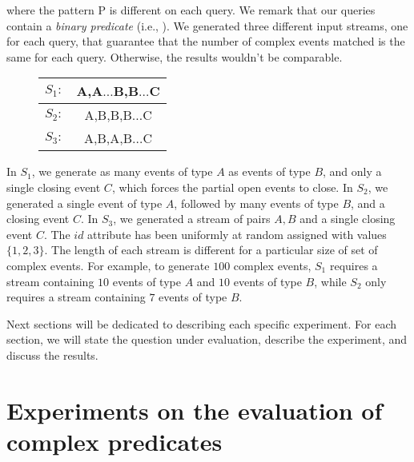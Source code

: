 where the pattern \textrm{P} is different on each query. We remark that our queries contain a \emph{binary predicate} (i.e., ). We generated three different input streams, one for each query, that guarantee that the number of complex events matched is the same for each query. Otherwise, the results wouldn't be comparable.

\begin{figure}[H]
  \centering
  \begin{tabular}{l c}
    \hline
    $S_{1}:$ & A,A$\ldots$B,B$\ldots$C\\
    \hline
    $S_{2}:$ & A,B,B,B$\ldots$C\\
    \hline
    $S_{3}:$ & A,B,A,B$\ldots$C\\
    \hline
  \end{tabular}
\end{figure}

In $S_{1}$, we generate as many events of type $A$ as events of type $B$, and only a single closing event $C$, which forces the partial open events to close. In $S_{2}$, we generated a single event of type $A$, followed by many events of type $B$, and a closing event $C$. In $S_{3}$, we generated a stream of pairs $A, B$ and a single closing event $C$. The $id$ attribute has been uniformly at random assigned with values $\{1, 2, 3\}$. The length of each stream is different for a particular size of set of complex events. For example, to generate $100$ complex events, $S_{1}$ requires a stream containing $10$ events of type $A$ and $10$ events of type $B$, while $S_{2}$ only requires a stream containing $7$ events of type $B$.

Next sections will be dedicated to describing each specific experiment. For each section, we will state the question under evaluation, describe the experiment, and discuss the results.

\section{Experiments on the evaluation of complex predicates}\label{sec:predicates}

